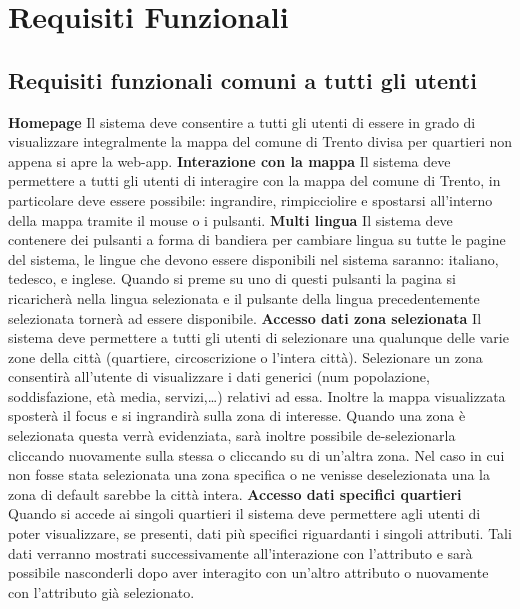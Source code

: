 \chapter{Requisiti Funzionali} 
    \section{Requisiti funzionali comuni a tutti gli utenti}
        \begin{rfList}
            \rfItem \textbf{Homepage} Il sistema deve consentire a tutti gli utenti di essere in grado di visualizzare integralmente la mappa del comune di Trento divisa per quartieri non appena si apre la web-app.
            \rfItem \textbf{Interazione con la mappa} Il sistema deve permettere a tutti gli utenti di interagire con la mappa del comune di Trento, in particolare deve essere possibile: ingrandire, rimpicciolire e spostarsi all'interno della mappa tramite il mouse o i pulsanti.
            \rfItem \textbf{Multi lingua} Il sistema deve contenere dei pulsanti a forma di bandiera per cambiare lingua su tutte le pagine del sistema, le lingue che devono essere disponibili nel sistema saranno: italiano, tedesco, e inglese. Quando si preme su uno di questi pulsanti la pagina si ricaricherà nella lingua selezionata e il pulsante della lingua precedentemente selezionata tornerà ad essere disponibile.
            \rfItem \textbf{Accesso dati zona selezionata} Il sistema deve permettere a tutti gli utenti di selezionare una qualunque delle varie zone della città (quartiere, circoscrizione o l'intera città). Selezionare un zona consentirà all'utente di visualizzare i dati generici (num popolazione, soddisfazione, età media, servizi,\dots) relativi ad essa. Inoltre la mappa visualizzata sposterà il focus e si ingrandirà sulla zona di interesse. Quando una zona è selezionata questa verrà evidenziata, sarà inoltre possibile de-selezionarla cliccando nuovamente sulla stessa o cliccando su di un'altra zona. Nel caso in cui non fosse stata selezionata una zona specifica o ne venisse deselezionata una la zona di default sarebbe la città intera.
            \rfItem \textbf{Accesso dati specifici quartieri} Quando si accede ai singoli quartieri il sistema deve permettere agli utenti di poter visualizzare, se presenti, dati più specifici riguardanti i singoli attributi. Tali dati verranno mostrati successivamente all'interazione con l'attributo e sarà possibile nasconderli dopo aver interagito con un'altro attributo o nuovamente con l'attributo già selezionato.
        \end{rfList} 
